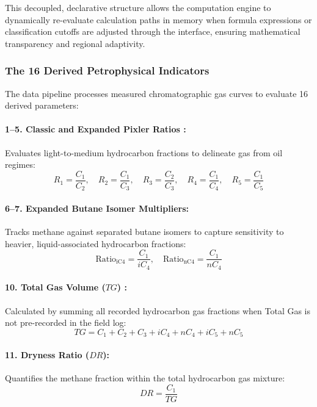 This decoupled, declarative structure allows the computation engine to dynamically re-evaluate calculation paths in memory when formula expressions or classification cutoffs are adjusted through the interface, ensuring mathematical transparency and regional adaptivity.

\subsubsection{The 16 Derived Petrophysical Indicators}
The data pipeline processes measured chromatographic gas curves to evaluate 16 derived parameters:

\paragraph{1--5. Classic and Expanded Pixler Ratios \citep{ref13}:}
Evaluates light-to-medium hydrocarbon fractions to delineate gas from oil regimes:
\begin{equation}
    R_1 = \frac{C_1}{C_2}, \quad R_2 = \frac{C_1}{C_3}, \quad R_3 = \frac{C_2}{C_3}, \quad R_4 = \frac{C_1}{C_4}, \quad R_5 = \frac{C_1}{C_5}
\end{equation}

\paragraph{6--7. Expanded Butane Isomer Multipliers:}
Tracks methane against separated butane isomers to capture sensitivity to heavier, liquid-associated hydrocarbon fractions:
\begin{equation}
    \text{Ratio}_{\text{iC4}} = \frac{C_1}{iC_4}, \quad \text{Ratio}_{\text{nC4}} = \frac{C_1}{nC_4}
\end{equation}

\paragraph{10. Total Gas Volume ($TG$) \citep{ref14}:}
Calculated by summing all recorded hydrocarbon gas fractions when Total Gas is not pre-recorded in the field log:
\begin{equation}
    TG = C_1 + C_2 + C_3 + iC_4 + nC_4 + iC_5 + nC_5
\end{equation}

\paragraph{11. Dryness Ratio ($DR$):}
Quantifies the methane fraction within the total hydrocarbon gas mixture:
\begin{equation}
    DR = \frac{C_1}{TG}
\end{equation}

